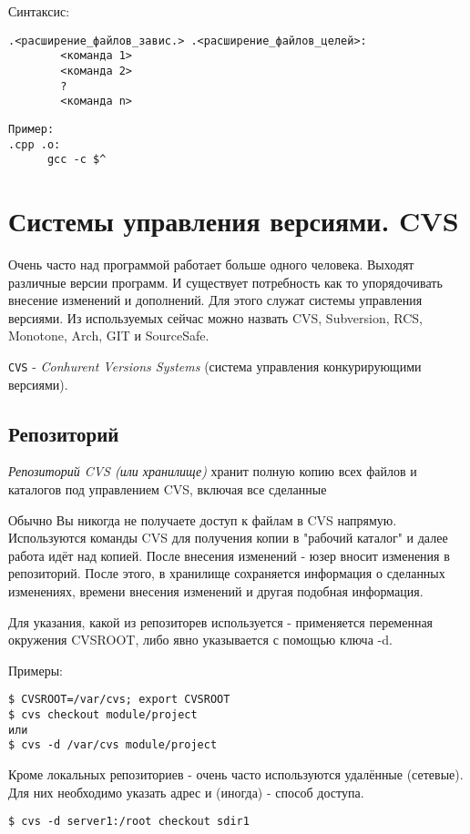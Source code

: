Синтаксис: 
\begin{verbatim}
.<расширение_файлов_завис.> .<расширение_файлов_целей>:
        <команда 1>
        <команда 2>
        ?
        <команда n>	
\end{verbatim}
\begin{verbatim}
Пример:
.cpp .o:
      gcc -c $^
\end{verbatim}


\section{Системы управления версиями. CVS}

Очень часто над программой работает больше одного человека. Выходят различные версии программ.  И существует потребность как то упорядочивать внесение изменений и дополнений. Для этого служат системы управления версиями. Из используемых сейчас можно назвать CVS, Subversion, RCS, Monotone, Arch, GIT и SourceSafe. 

\verb+CVS+ - \emph{Conhurent Versions Systems} (система управления конкурирующими версиями). 

\subsection{Репозиторий}

\emph{Репозиторий CVS (или хранилище)} хранит полную копию всех файлов и каталогов под управлением CVS,  включая все сделанные

Обычно Вы никогда не получаете доступ к файлам в CVS напрямую. Используются команды CVS для получения копии в "рабочий каталог" и далее работа идёт над копией. 
После внесения изменений - юзер вносит изменения в репозиторий. После этого, в хранилище сохраняется информация о сделанных изменениях, времени внесения изменений и другая подобная информация.

Для указания, какой из репозиторев используется - применяется переменная окружения CVSROOT, либо явно указывается с помощью ключа -d.

Примеры:
\begin{verbatim}
$ CVSROOT=/var/cvs; export CVSROOT
$ cvs checkout module/project
или
$ cvs -d /var/cvs module/project
\end{verbatim}

Кроме локальных репозиториев - очень часто используются удалённые (сетевые). Для них необходимо указать адрес и (иногда) - способ доступа.
\begin{verbatim}
$ cvs -d server1:/root checkout sdir1
\end{verbatim}

